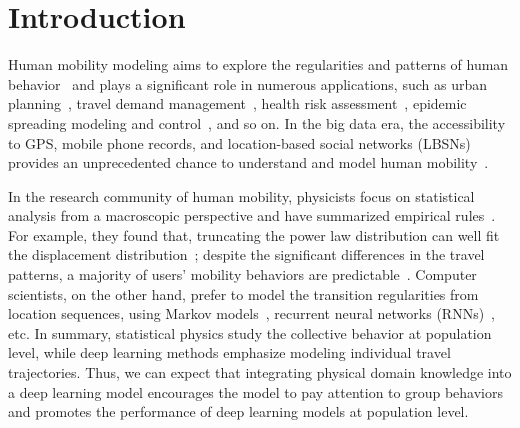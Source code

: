 \documentclass[sigconf]{acmart}
\begin{document}

\maketitle

\section{Introduction}
\label{sec:intro}
    Human mobility modeling aims to explore the regularities and patterns of human behavior~\cite{gonzalez2008understanding,barbosa2018human} and plays a significant role in numerous applications, such as urban planning~\cite{xu2021emergence}, travel demand management~\cite{ccolak2016understanding,xu2018planning}, health risk assessment~\cite{xu2019unraveling}, epidemic spreading modeling and control~\cite{arenas2020modeling,jia2020population}, and so on. In the big data era, the accessibility to GPS, mobile phone records, and location-based social networks (LBSNs) provides an unprecedented chance to understand and model human mobility~\cite{barbosa2018human,luca2020deep}.
    
    In the research community of human mobility, physicists focus on statistical analysis from a macroscopic perspective and have summarized empirical rules~\cite{barbosa2018human}. For example, they found that, truncating the power law distribution can well fit the displacement distribution~\cite{gonzalez2008understanding}; despite the significant differences in the travel patterns, a majority of users' mobility behaviors are predictable~\cite{song2010limits}.
    Computer scientists, on the other hand, prefer to model the transition regularities from location sequences, using Markov models~\cite{rendle2010factorizing}, recurrent neural networks (RNNs)~\cite{feng2018deepmove}, etc. In summary, statistical physics study the collective behavior at population level, while deep learning methods emphasize modeling individual travel trajectories. Thus, we can expect that integrating physical domain knowledge into a deep learning model encourages the model to pay attention to group behaviors and promotes the performance of deep learning models at population level.
    
\end{document}
